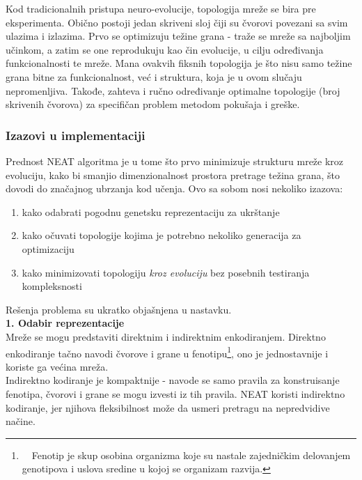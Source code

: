 \documentclass[a4paper]{article}
\begin{document}
Kod tradicionalnih pristupa neuro-evolucije, topologija mreže se bira pre eksperimenta. Obično postoji jedan skriveni sloj čiji su čvorovi povezani sa svim ulazima i izlazima. Prvo se optimizuju težine grana - traže se mreže sa najboljim učinkom, a zatim se one reprodukuju kao čin evolucije, u cilju određivanja funkcionalnosti te mreže. Mana ovakvih fiksnih topologija je što nisu samo težine grana bitne za funkcionalnost, već i struktura, koja je u ovom slučaju nepromenljiva. Takođe, zahteva i ručno određivanje optimalne topologije (broj skrivenih čvorova) za specifičan problem metodom pokušaja i greške.

\subsubsection*{Izazovi u implementaciji}
\label{izazovi}
Prednost NEAT algoritma je u tome što prvo minimizuje strukturu mreže kroz evoluciju, kako bi smanjio dimenzionalnost prostora pretrage težina grana, što dovodi do značajnog ubrzanja kod učenja. Ovo sa sobom nosi nekoliko izazova:

\begin{enumerate}[topsep=1pt, itemsep=-1ex, partopsep=1ex, parsep=1ex]
\item kako odabrati pogodnu genetsku reprezentaciju za ukrštanje
\item kako očuvati topologije kojima je potrebno nekoliko generacija za optimizaciju
\item kako minimizovati topologiju \emph{kroz evoluciju} bez posebnih testiranja kompleksnosti
\end{enumerate}
Rešenja problema su ukratko objašnjena u nastavku. \\

\noindent
\label{reprezentacija}
\textbf{1. Odabir reprezentacije} \\
\indent
Mreže se mogu predstaviti direktnim i indirektnim enkodiranjem. Direktno enkodiranje tačno navodi čvorove i grane u fenotipu\footnote{~~Fenotip je skup osobina organizma koje su nastale zajedničkim delovanjem genotipova i uslova sredine u kojoj se organizam razvija.}, ono je jednostavnije i koriste ga većina mreža.\\
Indirektno kodiranje je kompaktnije - navode se samo pravila za konstruisanje fenotipa, čvorovi i grane se mogu izvesti iz tih pravila. NEAT koristi indirektno kodiranje, jer njihova fleksibilnost može da usmeri pretragu na nepredvidive načine. \\
\end{document}
